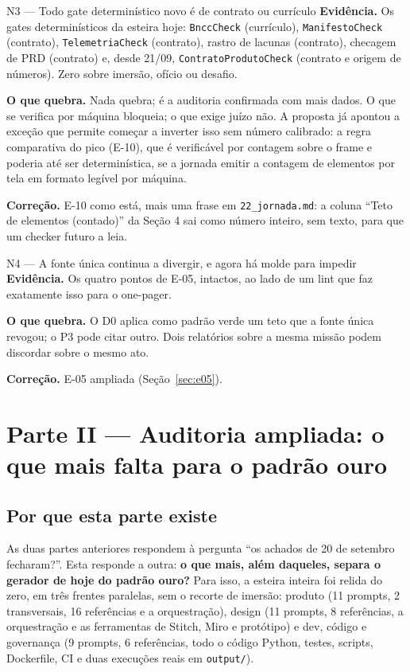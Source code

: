 \documentclass[11pt,a4paper]{article}
\begin{document}
\begin{achadobox}{N3 --- Todo gate determinístico novo é de contrato ou currículo}
\textbf{Evidência.} Os gates determinísticos da esteira hoje: \texttt{BnccCheck} (currículo),
\texttt{ManifestoCheck} (contrato), \texttt{TelemetriaCheck} (contrato), rastro de lacunas (contrato),
checagem de PRD (contrato) e, desde 21/09, \texttt{ContratoProdutoCheck} (contrato e origem de
números). Zero sobre imersão, ofício ou desafio.

\textbf{O que quebra.} Nada quebra; é a auditoria confirmada com mais dados. O que se verifica por
máquina bloqueia; o que exige juízo não. A proposta já apontou a exceção que permite começar a
inverter isso sem número calibrado: a regra comparativa do pico (E-10), que é verificável por
contagem sobre o frame e poderia até ser determinística, se a jornada emitir a contagem de elementos
por tela em formato legível por máquina.

\textbf{Correção.} E-10 como está, mais uma frase em \texttt{22\_jornada.md}: a coluna ``Teto de
elementos (contado)'' da Seção 4 sai como número inteiro, sem texto, para que um checker futuro a
leia.
\end{achadobox}

\begin{achadobox}{N4 --- A fonte única continua a divergir, e agora há molde para impedir}
\textbf{Evidência.} Os quatro pontos de E-05, intactos, ao lado de um lint que faz exatamente isso
para o one-pager.

\textbf{O que quebra.} O D0 aplica como padrão verde um teto que a fonte única revogou; o P3 pode
citar outro. Dois relatórios sobre a mesma missão podem discordar sobre o mesmo ato.

\textbf{Correção.} E-05 ampliada (Seção~\ref{sec:e05}).
\end{achadobox}

\section{Parte II --- Auditoria ampliada: o que mais falta para o padrão ouro}
\label{sec:parteII}

\subsection{Por que esta parte existe}

As duas partes anteriores respondem à pergunta ``os achados de 20 de setembro fecharam?''. Esta
responde a outra: \textbf{o que mais, além daqueles, separa o gerador de hoje do padrão ouro?} Para
isso, a esteira inteira foi relida do zero, em três frentes paralelas, sem o recorte de imersão:
produto (11 prompts, 2 transversais, 16 referências e a orquestração), design (11 prompts, 8
referências, a orquestração e as ferramentas de Stitch, Miro e protótipo) e dev, código e governança
(9 prompts, 6 referências, todo o código Python, testes, scripts, Dockerfile, CI e duas execuções
reais em \texttt{output/}).
\end{document}
